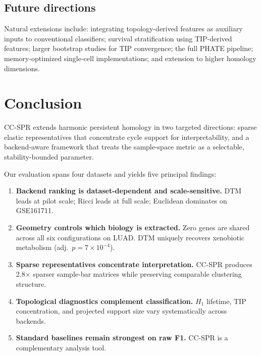 \documentclass[12pt]{article}
\begin{document}
\subsection{Future directions}

Natural extensions include: integrating topology-derived features as auxiliary inputs to conventional classifiers; survival stratification using TIP-derived features; larger bootstrap studies for TIP convergence; the full PHATE pipeline; memory-optimized single-cell implementations; and extension to higher homology dimensions.

\section{Conclusion}
\label{sec:conclusion}

CC-SPR extends harmonic persistent homology in two targeted directions: sparse elastic representatives that concentrate cycle support for interpretability, and a backend-aware framework that treats the sample-space metric as a selectable, stability-bounded parameter.

Our evaluation spans four datasets and yields five principal findings:
\begin{enumerate}[leftmargin=1.5em]
\item \textbf{Backend ranking is dataset-dependent and scale-sensitive.}
DTM leads at pilot scale; Ricci leads at full scale; Euclidean dominates on GSE161711.
\item \textbf{Geometry controls which biology is extracted.}
Zero genes are shared across all six configurations on LUAD.
DTM uniquely recovers xenobiotic metabolism (adj.\ $p = 7 \times 10^{-4}$).
\item \textbf{Sparse representatives concentrate interpretation.}
CC-SPR produces 2.8$\times$ sparser sample-bar matrices while preserving comparable clustering structure.
\item \textbf{Topological diagnostics complement classification.}
$H_1$ lifetime, TIP concentration, and projected support size vary systematically across backends.
\item \textbf{Standard baselines remain strongest on raw F1.}
CC-SPR is a complementary analysis tool.
\end{enumerate}

\end{document}

